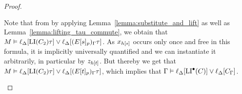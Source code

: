 \documentclass[,%
	draft=false,%
	numbers=noendperiod
	11pt,
	a4paper,
	oneside,%
	openany,
]{memoir}
\begin{document}
\begin{proof}
\begin{description}
\begin{itemize}
\begin{itemize}
							Note that from \markB{} by applying Lemma~\ref{lemma:substitute_and_lift} as well as Lemma~\ref{lemma:lifting_tau_commute}, we obtain that $M\vDash \ell_{\Delta}[\operatorname{LI}(C_2)\tau] \lor \ell_{\Delta}[(E{[s]_{p}})_\Gamma\tau]$.
							As $x_{h[s]}$ occurs only once and free in this formula, it is implicitly universally quantified and we can instantiate it arbitrarily, in particular by $z_{h[t]}$.
							But thereby we get that 
							$M\vDash \ell_{\Delta}[\operatorname{LI}(C_2)\tau] \lor \ell_{\Delta}[(E{[t]_{p}})_\Gamma\tau]$, 
							which implies that
							$\Gamma\vDash \ell_{\Delta}[\operatorname{LI}^\bullet(C)] \lor \ell_{\Delta}[C_\Gamma]$.
							\qedhere
					\end{itemize}
			\end{itemize}
	\end{description}
\end{proof}
\end{document}
